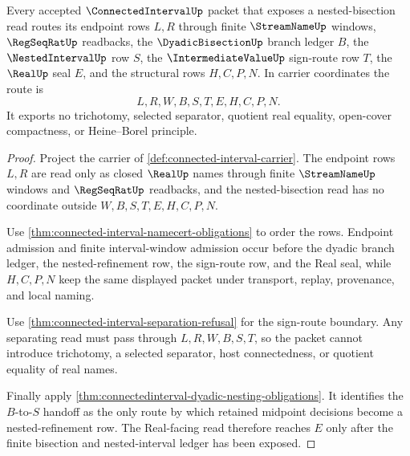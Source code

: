 \begin{theorem}
\label{thm:connected-interval-nested-bisection-ledger}
Every accepted $\ConnectedIntervalUp$ packet that exposes a nested-bisection read routes its endpoint rows $L,R$ through finite $\StreamNameUp$ windows, $\RegSeqRatUp$ readbacks, the $\DyadicBisectionUp$ branch ledger $B$, the $\NestedIntervalUp$ row $S$, the $\IntermediateValueUp$ sign-route row $T$, the $\RealUp$ seal $E$, and the structural rows $H,C,P,N$. In carrier coordinates the route is
$$
L,R,W,B,S,T,E,H,C,P,N .
$$
It exports no trichotomy, selected separator, quotient real equality, open-cover compactness, or Heine--Borel principle.
\end{theorem}
\begin{proof}
Project the carrier of \autoref{def:connected-interval-carrier}. The endpoint rows $L,R$ are read only as closed $\RealUp$ names through finite $\StreamNameUp$ windows and $\RegSeqRatUp$ readbacks, and the nested-bisection read has no coordinate outside $W,B,S,T,E,H,C,P,N$.

Use \autoref{thm:connected-interval-namecert-obligations} to order the rows. Endpoint admission and finite interval-window admission occur before the dyadic branch ledger, the nested-refinement row, the sign-route row, and the Real seal, while $H,C,P,N$ keep the same displayed packet under transport, replay, provenance, and local naming.

Use \autoref{thm:connected-interval-separation-refusal} for the sign-route boundary. Any separating read must pass through $L,R,W,B,S,T$, so the packet cannot introduce trichotomy, a selected separator, host connectedness, or quotient equality of real names.

Finally apply \autoref{thm:connectedinterval-dyadic-nesting-obligations}. It identifies the $B$-to-$S$ handoff as the only route by which retained midpoint decisions become a nested-refinement row. The Real-facing read therefore reaches $E$ only after the finite bisection and nested-interval ledger has been exposed.
\end{proof}

